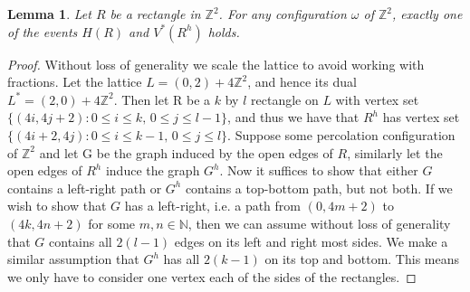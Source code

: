 \documentclass[a4paper,11pt]{article}
\newtheorem{lemma}[theorem]{Lemma}
\theoremstyle{definition}
\newcommand{\ints}{\mathbb{Z}}
\begin{document}
\begin{lemma}\label{rectangleProof}
	Let $R$ be a rectangle in $\ints^2$. For any configuration $\omega$ of $\ints^2$, exactly one of the events $H(R)$ and $V^*(R^h)$ holds.
\end{lemma}

\begin{proof}
	Without loss of generality we scale the lattice to avoid working with fractions. Let the lattice $L = (0,2) + 4\ints^2$, and hence its dual $L^* = (2,0)+4\ints^2$. Then let R be a $k$ by $l$ rectangle on $L$ with vertex set $\{(4i,4j+2): 0 \leq i \leq k \text{, } 0 \leq j \leq l-1 \}$, and thus we have that $R^h$ has vertex set $\{(4i+2,4j): 0 \leq i \leq k-1 \text{, } 0 \leq j \leq l \}$. Suppose some percolation configuration of $\ints^2$ and let G be the graph induced by the open edges of $R$, similarly let the open edges of $R^h$ induce the graph $G^h$. Now it suffices to show that either $G$ contains a left-right path or $G^h$ contains a top-bottom path, but not both. If we wish to show that $G$ has a left-right, i.e. a path from $(0,4m+2)$ to $(4k,4n+2)$ for some $m,n \in \mathbb{N}$, then we can assume without loss of generality that $G$ contains all $2(l-1)$ edges on its left and right most sides. We make a similar assumption that $G^h$ has all $2(k-1)$ on its top and bottom. This means we only have to consider one vertex each of the sides of the rectangles.


\end{proof}
\end{document}
